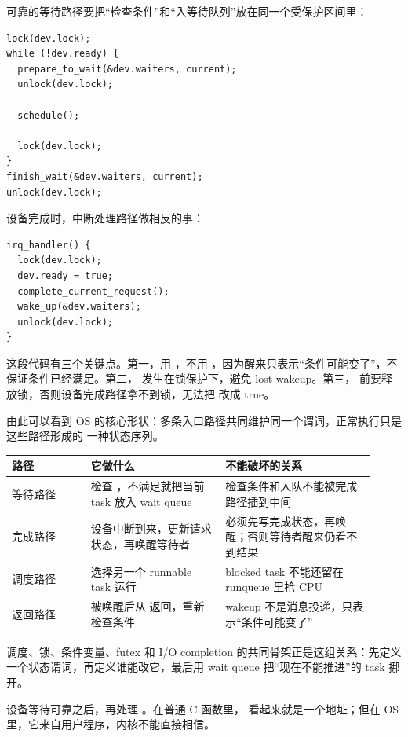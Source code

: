 可靠的等待路径要把“检查条件”和“入等待队列”放在同一个受保护区间里：

\begin{lstlisting}
lock(dev.lock);
while (!dev.ready) {
  prepare_to_wait(&dev.waiters, current);
  unlock(dev.lock);

  schedule();

  lock(dev.lock);
}
finish_wait(&dev.waiters, current);
unlock(dev.lock);
\end{lstlisting}

设备完成时，中断处理路径做相反的事：

\begin{lstlisting}
irq_handler() {
  lock(dev.lock);
  dev.ready = true;
  complete_current_request();
  wake_up(&dev.waiters);
  unlock(dev.lock);
}
\end{lstlisting}

这段代码有三个关键点。第一，用 ，不用 ，因为醒来只表示“条件可能变了”，不保证条件已经满足。第二， 发生在锁保护下，避免 lost wakeup。第三， 前要释放锁，否则设备完成路径拿不到锁，无法把  改成 true。

由此可以看到 OS 的核心形状：多条入口路径共同维护同一个谓词，正常执行只是这些路径形成的
一种状态序列。

\begin{longtable}{|L{0.2\linewidth}|L{0.34\linewidth}|L{0.38\linewidth}|}
\toprule
路径 & 它做什么 & 不能破坏的关系 \\
\midrule
等待路径 & 检查 ，不满足就把当前 task 放入 wait queue & 检查条件和入队不能被完成路径插到中间 \\\tablerowrule
完成路径 & 设备中断到来，更新请求状态，再唤醒等待者 & 必须先写完成状态，再唤醒；否则等待者醒来仍看不到结果 \\\tablerowrule
调度路径 &  选择另一个 runnable task 运行 & blocked task 不能还留在 runqueue 里抢 CPU \\\tablerowrule
返回路径 & 被唤醒后从  返回，重新检查条件 & wakeup 不是消息投递，只表示“条件可能变了” \\
\bottomrule
\end{longtable}

调度、锁、条件变量、futex 和 I/O completion 的共同骨架正是这组关系：先定义一个状态谓词，再定义谁能改它，最后用 wait queue 把“现在不能推进”的 task 挪开。

设备等待可靠之后，再处理 。在普通 C 函数里， 看起来就是一个地址；但在 OS 里，它来自用户程序，内核不能直接相信。

